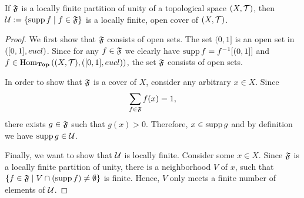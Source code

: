 \begin{lemma}\label{lemma:part_to_para}
	If $\mathfrak{F}$ is a locally finite partition of unity of a topological space $\tspace$, then $\mathcal{U} := {\left \{ \operatorname{supp} f \mid f \in \mathfrak{F} \right \}}$ is a locally finite, open cover of $\tspace$. 
\end{lemma}
\begin{proof}
	We first show that $\mathfrak{F}$ consists of open sets. The set $(0,1]$ is an open set in ${\left ( [0,1], eucl \right )}$. Since for any $f \in \mathfrak{F}$ we clearly have $\operatorname{supp} f = f^{-1}{\left [ (0,1] \right ]}$ and $f \in \Hom_\Top\pbraces{\tspace, \pbraces{[0,1], \eucl}}$, the set $\mathfrak{F}$ consists of open sets. 
	
	In order to show that $\mathfrak{F}$ is a cover of $X$, consider any arbitrary $x \in X$. Since 
	\begin{align*}
		\sum_{f \in \mathfrak{F}} f(x) = 1,
	\end{align*}
	there exists $g \in \mathfrak{F}$ such that $g(x) > 0$. Therefore, $x \in \operatorname{supp} g$ and by definition we have $\operatorname{supp} g \in \mathcal{U}$. 
	
	Finally, we want to show that $\mathcal{U}$ is locally finite. Consider some $x \in X$. Since $\mathfrak{F}$ is a locally finite partition of unity, there is a neighborhood $V$ of $x$, such that ${\left \{ f \in \mathfrak{F} \mid V \cap {\left ( \operatorname{supp}f \right )} \neq \emptyset \right \}}$ is finite. Hence, $V$ only meets a finite number of elements of $\mathcal{U}$. 
\end{proof}

